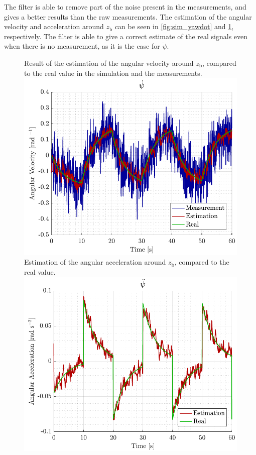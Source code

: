 The filter is able to remove part of the noise present in the measurements, and gives a better results than the raw measurements.
%
The estimation of the angular velocity and acceleration around $z_\mathrm{b}$ can be seen in \autoref{fig:sim_yawdot} and \ref{fig:sim_yawddot}, respectively. The filter is able to give a correct estimate of the real signals even when there is no measurement, as it is the case for $\ddot{\psi}$.
%
\begin{figure}[H]
    \captionbox 
    {   
        Result of the estimation of the angular velocity around $z_\mathrm{b}$, compared to the real value in the simulation and the measurements.
        \label{fig:sim_yawdot}
    }                                                                 
    {                                                                  
        \includegraphics[width=.45\textwidth]{figures/sim_yawdot}         
    }                                                                    
    \hspace{5pt}                                                          
    \captionbox  
    {      
        Estimation of the angular acceleration around $z_\mathrm{b}$, compared to the real value.
        \label{fig:sim_yawddot}
    }                                                                          
    {
        \includegraphics[width=.45\textwidth]{figures/sim_yawddot}
    }
\end{figure}
%
